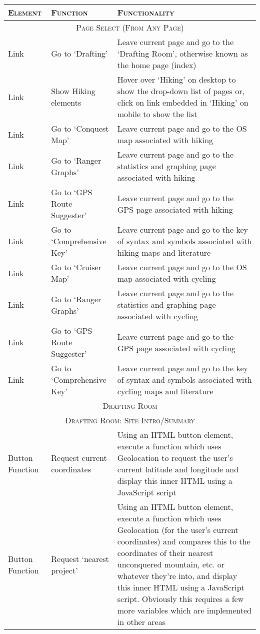 \documentclass[11pt, english]{article}
\begin{document}
	\begin{center}
		\scriptsize
	\begin{longtable}{p{3cm}lp{6cm}}
		\textsc{Element} & \textsc{Function} & \textsc{Functionality}\\
		\hline
		\hline
		\multicolumn{3}{c}{\textsc{Page Select (From Any Page)}}\\
		\hline
		\hline
		Link & Go to `Drafting' & Leave current page and go to the `Drafting Room', otherwise known as the home page (index)\\
		Link & Show Hiking elements & Hover over `Hiking' on desktop to show the drop-down list of pages or, click on link embedded in `Hiking' on mobile to show the list\\
		Link & Go to `Conquest Map' & Leave current page and go to the OS map associated with hiking\\
		Link & Go to `Ranger Graphs' & Leave current page and go to the statistics and graphing page associated with hiking\\
		Link & Go to `GPS Route Suggester' & Leave current page and go to the GPS page associated with hiking\\
		Link & Go to `Comprehensive Key' & Leave current page and go to the key of syntax and symbols associated with hiking maps and literature\\
		Link & Go to `Cruiser Map' & Leave current page and go to the OS map associated with cycling\\
		Link & Go to `Ranger Graphs' & Leave current page and go to the statistics and graphing page associated with cycling\\
		Link & Go to `GPS Route Suggester' & Leave current page and go to the GPS page associated with cycling\\
		Link & Go to `Comprehensive Key' & Leave current page and go to the key of syntax and symbols associated with cycling maps and literature\\
		\hline
		\hline
		\multicolumn{3}{c}{\textsc{Drafting Room}}\\
		\hline
		\hline
		\multicolumn{3}{c}{\textsc{Drafting Room: Site Intro/Summary}}\\
		\hline
		Button Function & Request current coordinates & Using an HTML button element, execute a function which uses Geolocation to request the user's current latitude and longitude and display this inner HTML using a JavaScript script\\
		Button Function & Request `nearest project' & Using an HTML button element, execute a function which uses Geolocation (for the user's current coordinates) and compares this to the coordinates of their nearest unconquered mountain, etc. or whatever they're into, and display this inner HTML using a JavaScript script. Obviously this requires a few more variables which are implemented in other areas\\

\end{longtable}
\end{center}
\end{document}
